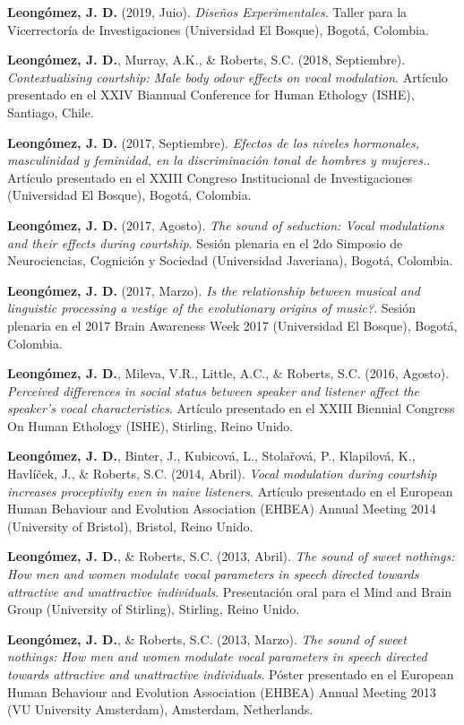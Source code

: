 \documentclass[11pt, a4paper]{awesome-cv}
\begin{document}
\textbf{Leongómez, J. D.} (2019, Juio). \emph{Diseños Experimentales}.
Taller para la Vicerrectoría de Investigaciones (Universidad El Bosque),
Bogotá, Colombia.

\textbf{Leongómez, J. D.}, Murray, A.K., \& Roberts, S.C. (2018,
Septiembre). \emph{Contextualising courtship: Male body odour effects on
vocal modulation}. Artículo presentado en el XXIV Biannual Conference
for Human Ethology (ISHE), Santiago, Chile.

\textbf{Leongómez, J. D.} (2017, Septiembre). \emph{Efectos de los
niveles hormonales, masculinidad y feminidad, en la discriminación tonal
de hombres y mujeres.}. Artículo presentado en el XXIII Congreso
Institucional de Investigaciones (Universidad El Bosque), Bogotá,
Colombia.

\textbf{Leongómez, J. D.} (2017, Agosto). \emph{The sound of seduction:
Vocal modulations and their effects during courtship}. Sesión plenaria
en el 2do Simposio de Neurociencias, Cognición y Sociedad (Universidad
Javeriana), Bogotá, Colombia.

\textbf{Leongómez, J. D.} (2017, Marzo). \emph{Is the relationship
between musical and linguistic processing a vestige of the evolutionary
origins of music?}. Sesión plenaria en el 2017 Brain Awareness Week 2017
(Universidad El Bosque), Bogotá, Colombia.

\textbf{Leongómez, J. D.}, Mileva, V.R., Little, A.C., \& Roberts, S.C.
(2016, Agosto). \emph{Perceived differences in social status between
speaker and listener affect the speaker's vocal characteristics}.
Artículo presentado en el XXIII Biennial Congress On Human Ethology
(ISHE), Stirling, Reino Unido.

\textbf{Leongómez, J. D.}, Binter, J., Kubicová, L., Stolařová, P.,
Klapilová, K., Havlíček, J., \& Roberts, S.C. (2014, Abril). \emph{Vocal
modulation during courtship increases proceptivity even in naive
listeners}. Artículo presentado en el European Human Behaviour and
Evolution Association (EHBEA) Annual Meeting 2014 (University of
Bristol), Bristol, Reino Unido.

\textbf{Leongómez, J. D.}, \& Roberts, S.C. (2013, Abril). \emph{The
sound of sweet nothings: How men and women modulate vocal parameters in
speech directed towards attractive and unattractive individuals}.
Presentación oral para el Mind and Brain Group (University of Stirling),
Stirling, Reino Unido.

\textbf{Leongómez, J. D.}, \& Roberts, S.C. (2013, Marzo). \emph{The
sound of sweet nothings: How men and women modulate vocal parameters in
speech directed towards attractive and unattractive individuals}. Póster
presentado en el European Human Behaviour and Evolution Association
(EHBEA) Annual Meeting 2013 (VU University Amsterdam), Amsterdam,
Netherlands.
\end{document}

